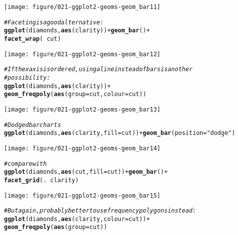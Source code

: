 \documentclass[a4paper,titlepage]{tufte-handout}\usepackage[]{graphicx}\usepackage[]{color}
\makeatletter
\def\maxwidth{ %
  \ifdim\Gin@nat@width>\linewidth
    \linewidth
  \else
    \Gin@nat@width
  \fi
}
\newcommand{\hlstr}[1]{\textcolor[rgb]{0.192,0.494,0.8}{#1}}%
\newcommand{\hlcom}[1]{\textcolor[rgb]{0.678,0.584,0.686}{\textit{#1}}}%
\newcommand{\hlopt}[1]{\textcolor[rgb]{0,0,0}{#1}}%
\newcommand{\hlstd}[1]{\textcolor[rgb]{0.345,0.345,0.345}{#1}}%
\newcommand{\hlkwc}[1]{\textcolor[rgb]{0.333,0.667,0.333}{#1}}%
\newcommand{\hlkwd}[1]{\textcolor[rgb]{0.737,0.353,0.396}{\textbf{#1}}}%
\newenvironment{kframe}{%
 \def\at@end@of@kframe{}%
 \ifinner\ifhmode%
  \def\at@end@of@kframe{\end{minipage}}%
  \begin{minipage}{\columnwidth}%
 \fi\fi%
 \def\FrameCommand##1{\hskip\@totalleftmargin \hskip-\fboxsep
 \colorbox{shadecolor}{##1}\hskip-\fboxsep
     \hskip-\linewidth \hskip-\@totalleftmargin \hskip\columnwidth}%
 \MakeFramed {\advance\hsize-\width
   \@totalleftmargin\z@ \linewidth\hsize
   \@setminipage}}%
 {\par\unskip\endMakeFramed%
 \at@end@of@kframe}
\newenvironment{knitrout}{}{} %
\makeatother
\begin{document}
\begin{knitrout}
\begin{kframe}
\begin{alltt}
\end{alltt}
\end{kframe}
\texttt{[image: figure/021-ggplot2-geoms-geom\_bar11]} 
\begin{kframe}\begin{alltt}
\hlcom{# Faceting is a good alternative:}
\hlkwd{ggplot}\hlstd{(diamonds,} \hlkwd{aes}\hlstd{(clarity))} \hlopt{+} \hlkwd{geom_bar}\hlstd{()} \hlopt{+}
  \hlkwd{facet_wrap}\hlstd{(}\hlopt{~} \hlstd{cut)}
\end{alltt}
\end{kframe}
\texttt{[image: figure/021-ggplot2-geoms-geom\_bar12]} 
\begin{kframe}\begin{alltt}
\hlcom{# If the x axis is ordered, using a line instead of bars is another}
\hlcom{# possibility:}
\hlkwd{ggplot}\hlstd{(diamonds,} \hlkwd{aes}\hlstd{(clarity))} \hlopt{+}
  \hlkwd{geom_freqpoly}\hlstd{(}\hlkwd{aes}\hlstd{(}\hlkwc{group} \hlstd{= cut,} \hlkwc{colour} \hlstd{= cut))}
\end{alltt}
\end{kframe}
\texttt{[image: figure/021-ggplot2-geoms-geom\_bar13]} 
\begin{kframe}\begin{alltt}
\hlcom{# Dodged bar charts}
\hlkwd{ggplot}\hlstd{(diamonds,} \hlkwd{aes}\hlstd{(clarity,} \hlkwc{fill}\hlstd{=cut))} \hlopt{+} \hlkwd{geom_bar}\hlstd{(}\hlkwc{position}\hlstd{=}\hlstr{"dodge"}\hlstd{)}
\end{alltt}
\end{kframe}
\texttt{[image: figure/021-ggplot2-geoms-geom\_bar14]} 
\begin{kframe}\begin{alltt}
\hlcom{# compare with}
\hlkwd{ggplot}\hlstd{(diamonds,} \hlkwd{aes}\hlstd{(cut,} \hlkwc{fill}\hlstd{=cut))} \hlopt{+} \hlkwd{geom_bar}\hlstd{()} \hlopt{+}
  \hlkwd{facet_grid}\hlstd{(.} \hlopt{~} \hlstd{clarity)}
\end{alltt}
\end{kframe}
\texttt{[image: figure/021-ggplot2-geoms-geom\_bar15]} 
\begin{kframe}\begin{alltt}
\hlcom{# But again, probably better to use frequency polygons instead:}
\hlkwd{ggplot}\hlstd{(diamonds,} \hlkwd{aes}\hlstd{(clarity,} \hlkwc{colour}\hlstd{=cut))} \hlopt{+}
  \hlkwd{geom_freqpoly}\hlstd{(}\hlkwd{aes}\hlstd{(}\hlkwc{group} \hlstd{= cut))}
\end{alltt}

\end{kframe}
\end{knitrout}
\end{document}
